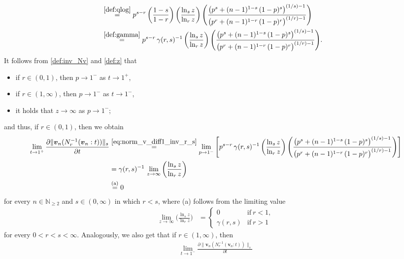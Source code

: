 \documentclass[conference, draftcls, onecolumn]{IEEEtran}
\theoremstyle{plain}
\newcommand{\bvec}[1]{\boldsymbol{#1}}
\newcommand{\lemref}[1]{Lemma~\ref{#1}}
\begin{document}
\begin{IEEEproof}[Proof of \lemref{lem:slope_v}]
\begin{align}
\\
& \overset{\eqref{def:qlog}}{=}
p^{s-r} \, \bigg( \frac{ 1 - s }{ 1 - r } \bigg) \, \bigg( \frac{ \ln_{s} z }{ \ln_{r} z } \bigg) \, \Bigg( \frac{ \big( p^{s} + (n-1)^{1-s} \, (1-p)^{s} \big)^{(1/s)-1} }{ \big( p^{r} + (n-1)^{1-r} \, (1-p)^{r} \big)^{(1/r)-1} } \Bigg)
\\
& \overset{\eqref{def:gamma}}{=}
p^{s-r} \, \gamma(r, s)^{-1} \, \bigg( \frac{ \ln_{s} z }{ \ln_{r} z } \bigg) \, \Bigg( \frac{ \big( p^{s} + (n-1)^{1-s} \, (1-p)^{s} \big)^{(1/s)-1} }{ \big( p^{r} + (n-1)^{1-r} \, (1-p)^{r} \big)^{(1/r)-1} } \Bigg) .
\label{eq:norm_v_diff1_inv_r_s}
\end{align}
It follows from \eqref{def:inv_Nv} and \eqref{def:z} that
\begin{itemize}
\item
if $r \in (0, 1)$, then $p \to 1^{-}$ as $t \to 1^{+}$,
\item
if $r \in (1, \infty)$, then $p \to 1^{-}$ as $t \to 1^{-}$,
\item
it holds that $z \to \infty$ as $p \to 1^{-}$;
\end{itemize}
and thus, if $r \in (0, 1)$, then we obtain
\begin{align}
\lim_{t \to 1^{+}} \frac{ \partial \| \bvec{v}_{n}( N_{r}^{-1}( \bvec{v}_{n} : t ) ) \|_{s} }{ \partial t }
& \overset{\eqref{eq:norm_v_diff1_inv_r_s}}{=}
\lim_{p \to 1^{-}} \Bigg[ p^{s-r} \, \gamma(r, s)^{-1} \, \bigg( \frac{ \ln_{s} z }{ \ln_{r} z } \bigg) \, \Bigg( \frac{ \big( p^{s} + (n-1)^{1-s} \, (1-p)^{s} \big)^{(1/s)-1} }{ \big( p^{r} + (n-1)^{1-r} \, (1-p)^{r} \big)^{(1/r)-1} } \Bigg) \Bigg]
\\
& =
\gamma(r, s)^{-1} \, \lim_{z \to \infty} \bigg( \frac{ \ln_{s} z }{ \ln_{r} z } \bigg)
\\
& \overset{\text{(a)}}{=}
0
\label{limit:t_plus}
\end{align}
for every $n \in \mathbb{N}_{\ge 2}$ and $s \in (0, \infty)$ in which $r < s$, where (a) follows from the limiting value
\begin{align}
\lim_{z \to \infty} \bigg( \frac{ \ln_{s} z }{ \ln_{r} z } \bigg)
& =
\begin{cases}
0
& \mathrm{if} \ r < 1 ,
\\
\gamma( r, s )
& \mathrm{if} \ r > 1
\end{cases}
\end{align}
for every $0 < r < s < \infty$.
Analogously, we also get that if $r \in (1, \infty)$, then
\begin{align}
\lim_{t \to 1^{-}} \frac{ \partial \| \bvec{v}_{n}( N_{r}^{-1}( \bvec{v}_{n} : t ) ) \|_{s} }{ \partial t }

\end{align}
\end{IEEEproof}
\end{document}
